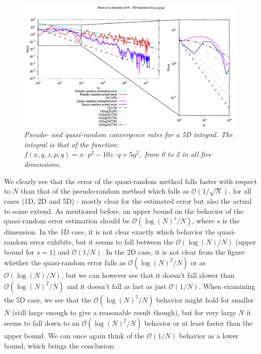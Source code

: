 \documentclass{article}
\begin{document}
\begin{figure}[t]
    \centering
    \includegraphics[width=\textwidth]{Convergence5D.png}
    \caption{\textsl{Pseudo- and quasi-random convergence rates for a 5D integral. The integral is that 
of the function:} $f(x,y,z,p,q)=x\cdot p^2 -10 z\cdot q + 5y^2,$ \textsl{from 0 to 2 in all five dimensions.}}
    \label{fig:5D}
\end{figure}



We clearly see that the error of the quasi-random method falls faster with respect
to $N$ than that of the pseudo-random method which falls as $\mathcal{O}(1/\sqrt{N})$, for all cases (1D, 2D and
5D) - mostly clear for the estimated error but also the actual to some extend. As mentioned before, an upper bound on
the behavior of the quasi-random error estimation should be $\mathcal{O}(\log(N)^s/N)$, where $s$ is the dimension. In the
1D case, it is not clear exactly which behavior the quasi-random error exhibits, but it seems to fall between the
$\mathcal{O}(\log(N)/N)$ (upper bound for $s=1$) and $\mathcal{O}(1/N)$. In the
2D case, it is not clear from the figure whether the quasi-random error falls as
$\mathcal{O}(\log(N)^2/N)$ or as $\mathcal{O}(\log(N)/N)$, but we can however see that it doesn't fall slower
than $\mathcal{O}(\log(N)^2/N)$ and it doesn't fall as fast as just $\mathcal{O}(1/N)$.
When examining the 5D case, we see that the $\mathcal{O}(\log(N)^5/N)$ behavior might hold for
smaller $N$ (still large enough to give a reasonable result though), but for very
large $N$ it seems to fall down to an $\mathcal{O}(\log(N)^2/N)$ behavior or at least faster than
the upper bound. We can once again think of the $\mathcal{O}(1/N)$ behavior as a lower bound,
which brings the conclusion:
\\
\end{document}
